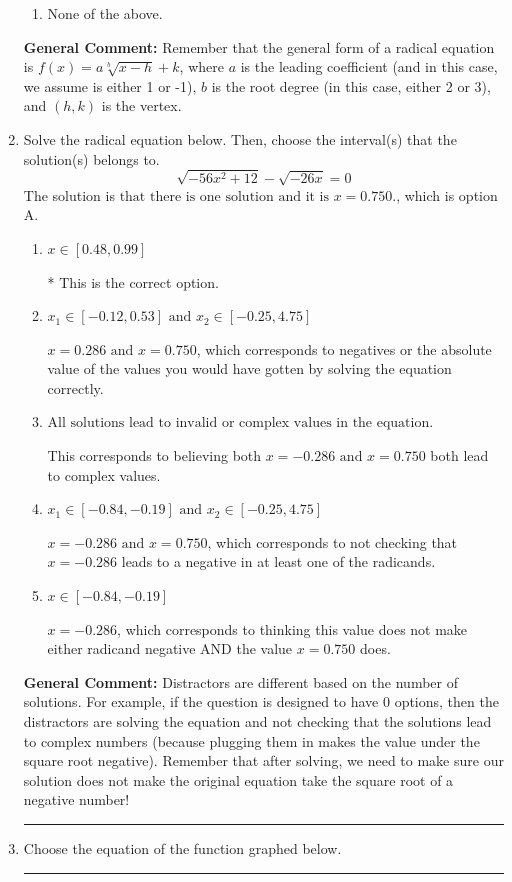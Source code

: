 \documentclass{extbook}[14pt]
\newcommand{\litem}[1]{\item #1

\rule{\textwidth}{0.4pt}}
\begin{document}
\begin{enumerate}
{\begin{enumerate}[label=\Alph*.]
\begin{multicols}{2}
\end{multicols}\item None of the above.\end{enumerate}
\textbf{General Comment:} Remember that the general form of a radical equation is $ f(x) = a \sqrt[b]{x - h} + k $, where $a$ is the leading coefficient (and in this case, we assume is either 1 or -1), $b$ is the root degree (in this case, either 2 or 3), and $(h, k)$ is the vertex.
}
\litem{
Solve the radical equation below. Then, choose the interval(s) that the solution(s) belongs to.
\[ \sqrt{-56 x^2 + 12} - \sqrt{-26 x} = 0 \]The solution is \( \text{that there is one solution and it is } x = 0.750. \), which is option A.\begin{enumerate}[label=\Alph*.]
\item \( x \in [0.48,0.99] \)

* This is the correct option.
\item \( x_1 \in [-0.12, 0.53] \text{ and } x_2 \in [-0.25,4.75] \)

$x = 0.286 \text{ and } x = 0.750$, which corresponds to negatives or the absolute value of the values you would have gotten by solving the equation correctly.
\item \( \text{All solutions lead to invalid or complex values in the equation.} \)

This corresponds to believing both $x = -0.286 \text{ and } x = 0.750$ both lead to complex values.
\item \( x_1 \in [-0.84, -0.19] \text{ and } x_2 \in [-0.25,4.75] \)

$x = -0.286 \text{ and } x = 0.750$, which corresponds to not checking that $x = -0.286$ leads to a negative in at least one of the radicands.
\item \( x \in [-0.84,-0.19] \)

$x = -0.286$, which corresponds to thinking this value does not make either radicand negative AND the value $x = 0.750$ does.
\end{enumerate}

\textbf{General Comment:} Distractors are different based on the number of solutions. For example, if the question is designed to have 0 options, then the distractors are solving the equation and not checking that the solutions lead to complex numbers (because plugging them in makes the value under the square root negative). Remember that after solving, we need to make sure our solution does not make the original equation take the square root of a negative number!
}
\litem{
Choose the equation of the function graphed below.

}
\end{enumerate}
\end{document}
